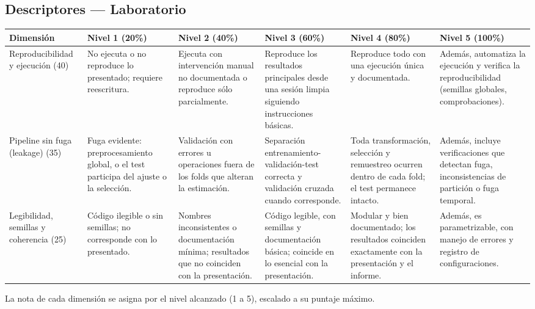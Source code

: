 \documentclass[11pt,letterpaper]{article}
\begin{document}
\begin{landscape}
\thispagestyle{plain}
\section*{Descriptores --- Laboratorio}
\footnotesize\renewcommand{\arraystretch}{1.25}
\begin{tabular}{p{2.4cm} p{3.15cm} p{3.15cm} p{3.15cm} p{3.15cm} p{3.15cm}}
\toprule
Dimensión & Nivel 1 (20\%) & Nivel 2 (40\%) & Nivel 3 (60\%) & Nivel 4 (80\%) & Nivel 5 (100\%) \\
\midrule
Reproducibilidad y ejecución (40) & No ejecuta o no reproduce lo presentado; requiere reescritura. & Ejecuta con intervención manual no documentada o reproduce sólo parcialmente. & Reproduce los resultados principales desde una sesión limpia siguiendo instrucciones básicas. & Reproduce todo con una ejecución única y documentada. & Además, automatiza la ejecución y verifica la reproducibilidad (semillas globales, comprobaciones). \\
Pipeline sin fuga (leakage) (35) & Fuga evidente: preprocesamiento global, o el test participa del ajuste o la selección. & Validación con errores u operaciones fuera de los folds que alteran la estimación. & Separación entrenamiento-validación-test correcta y validación cruzada cuando corresponde. & Toda transformación, selección y remuestreo ocurren dentro de cada fold; el test permanece intacto. & Además, incluye verificaciones que detectan fuga, inconsistencias de partición o fuga temporal. \\
Legibilidad, semillas y coherencia (25) & Código ilegible o sin semillas; no corresponde con lo presentado. & Nombres inconsistentes o documentación mínima; resultados que no coinciden con la presentación. & Código legible, con semillas y documentación básica; coincide en lo esencial con la presentación. & Modular y bien documentado; los resultados coinciden exactamente con la presentación y el informe. & Además, es parametrizable, con manejo de errores y registro de configuraciones. \\
\bottomrule
\end{tabular}

\vspace{0.25cm}
\footnotesize La nota de cada dimensión se asigna por el nivel alcanzado (1 a 5), escalado a su puntaje máximo.
\end{landscape}
\end{document}
